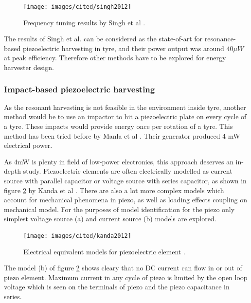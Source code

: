 \begin{figure}[htb]
  \begin{center}
  \texttt{[image: images/cited/singh2012]}
  \end{center}
  \caption{Frequency tuning results by Singh et al \cite{Singh2012}.}
  \label{fiq:tracking_piezo}
\end{figure}

The results of Singh et al. can be considered as the state-of-art for resonance-based piezoelectric harvesting in tyre, and their power output was around $40 \mu W$ at peak efficiency. Therefore other methods have to be explored for energy harvester design.

\subsubsection{Impact-based piezoelectric harvesting}
As the resonant harvesting is not feasible in the environment inside tyre, another method would be to use an impactor to hit a piezoelectric plate on every cycle of a tyre. These impacts would provide energy once per rotation of a tyre. This method has been tried before by Manla et al \cite{Manla2009}. Their generator produced 4 mW electrical power.

As 4mW is plenty in field of low-power electronics, this approach deserves an in-depth study. Piezoelectric elements are often electrically modelled as current source with parallel capacitor or voltage source with series capacitor, as shown in figure \ref{fig:piezo_equivalents} by Kanda et al \cite{Kanda2012}. There are also a lot more complex models which account for mechanical phenomena in piezo, as well as loading effects coupling on mechanical model. For the purposes of model identification for the piezo only simplest voltage source (a) and current source (b) models are explored.

\begin{figure}[htb]
  \begin{center}
  \texttt{[image: images/cited/kanda2012]}
  \end{center}
  \caption{Electrical equivalent models for piezoelectric element \cite{Kanda2012}.}
  \label{fig:piezo_equivalents}
\end{figure}

The model (b) of figure \ref{fig:piezo_equivalents} shows cleary that no DC current can flow in or out of piezo element. Maximum current in any cycle of piezo is limited by the open loop voltage which is seen on the terminals of piezo and the piezo capacitance in series. 

